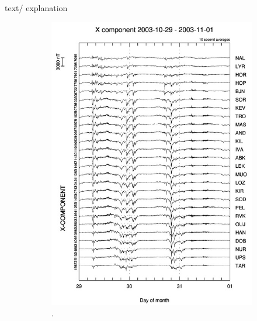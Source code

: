 text/ explanation

\begin{figure}[H]
        \begin{subfigure}[b]{0.33\textwidth}
                \includegraphics[width=\linewidth]{figures/IMAGE_X_gram.jpg}
                \caption{\cite{image}.}
				\label{fig:image_x_gram}
        \end{subfigure}%
        \begin{subfigure}[b]{0.34\textwidth}

\end{subfigure}
\end{figure}

